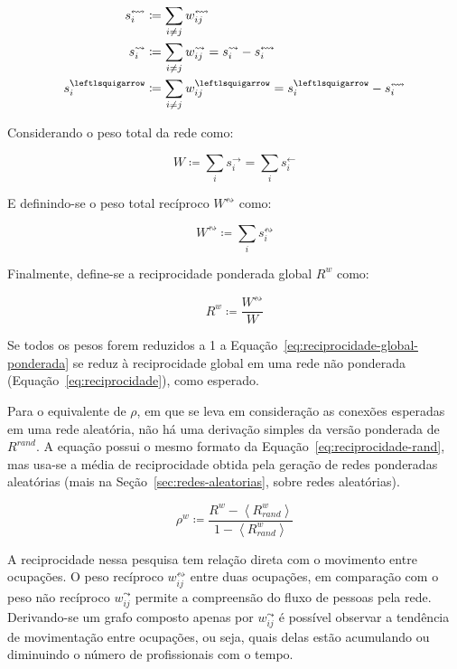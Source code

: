 \documentclass[12pt,a4paper]{article}
\theoremstyle{hypo}
\newcommand{\avg}[1]{\left\langle #1 \right\rangle} %
\newcommand{\defn}{\coloneqq} %
\newcommand{\linkin}[1]{#1^\leftarrow} %
\newcommand{\linkout}[1]{#1^\rightarrow} %
\newcommand{\weighted}[1]{#1^w} %
\newcommand{\recin}[1]{#1^\leftlsquigarrow} %
\newcommand{\recout}[1]{#1^\leadsto} %
\newcommand{\recboth}[1]{#1^\leftrightsquigarrow} %
\begin{document}
\begin{align}
\recboth{s}_i &\defn \sum_{i \neq j} \recboth{w}_{ij} \label{eq:forca-reciproca} \\
\recout{s}_i  &\defn \sum_{i \neq j} \recout{w}_{ij} = \recout{s}_i - \recboth{s}_i \label{eq:forca-reciproca-saida} \\
\recin{s}_i   &\defn \sum_{i \neq j} \recin{w}_{ij} = \recin{s}_i - \recboth{s}_i \label{eq:forca-reciproca-entrada}
\end{align}

Considerando o peso total da rede como:

\begin{equation}
W \defn \sum_i \linkout{s}_i = \sum_i \linkin{s}_i
\end{equation}

E definindo-se o peso total recíproco $\recboth{W}$ como:

\begin{equation}
\recboth{W} \defn \sum_i \recboth{s}_i
\end{equation}

Finalmente, define-se a reciprocidade ponderada global $\weighted{R}$ como:

\begin{equation} \label{eq:reciprocidade-global-ponderada}
\weighted{R} \defn \frac{\recboth{W}}{W}
\end{equation}

Se todos os pesos forem reduzidos a 1 a Equação~\ref{eq:reciprocidade-global-ponderada} se reduz à reciprocidade global em uma rede não ponderada (Equação~\ref{eq:reciprocidade}), como esperado.

Para o equivalente de $\rho$, em que se leva em consideração as conexões esperadas em uma rede aleatória, não há uma derivação simples da versão ponderada de $R^\textit{rand}$. A equação possui o mesmo formato da Equação~\ref{eq:reciprocidade-rand}, mas usa-se a média de reciprocidade obtida pela geração de redes ponderadas aleatórias (mais na Seção~\ref{sec:redes-aleatorias}, sobre redes aleatórias).

\begin{equation}
\weighted{\rho} \defn \frac{\weighted{R} - \avg{\weighted{R}_\textit{rand}}}{1 -  \avg{\weighted{R}_\textit{rand}}}
\end{equation}

A reciprocidade nessa pesquisa tem relação direta com o movimento entre ocupações. O peso recíproco $\recboth{w}_{ij}$ entre duas ocupações, em comparação com o peso não recíproco $\recout{w}_{ij}$ permite a compreensão do fluxo de pessoas pela rede. Derivando-se um grafo composto apenas por $\recout{w}_{ij}$ é possível observar a tendência de movimentação entre ocupações, ou seja, quais delas estão acumulando ou diminuindo o número de profissionais com o tempo.
\end{document}
